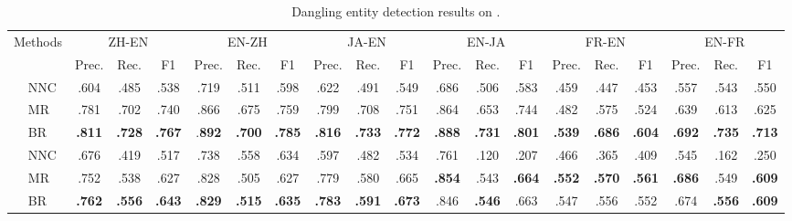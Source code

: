 \begin{table*}[!t]
	\centering
{
	\small
	\setlength{\tabcolsep}{3pt}
		\begin{tabular}{llcccccccccccccccccc}
			\toprule
\multicolumn{2}{c}{\multirow{2}{*}{Methods}} &
			\multicolumn{3}{c}{ZH-EN} & \multicolumn{3}{c}{EN-ZH} & \multicolumn{3}{c}{JA-EN} & \multicolumn{3}{c}{EN-JA} &  \multicolumn{3}{c}{FR-EN} & \multicolumn{3}{c}{EN-FR}\\
			\cmidrule(lr){3-5} \cmidrule(lr){6-8} \cmidrule(lr){9-11} \cmidrule(lr){12-14} \cmidrule(lr){15-17} \cmidrule(lr){18-20}
			&& Prec. & Rec. & F1 & Prec. & Rec. & F1 & Prec. & Rec. & F1 & Prec. & Rec. & F1 & Prec. & Rec. & F1 & Prec. & Rec. & F1 \\ 
			\midrule
			\parbox[t]{2mm}{} 
			& NNC & .604 & .485 & .538 & .719 & .511 & .598 & .622 & .491 & .549 & .686 & .506 & .583 & .459 & .447 & .453 & .557 & .543 & .550 \\
			& MR & .781 & .702 & .740 & .866 & .675 & .759 & .799 & .708 & .751 & .864 & .653 & .744 & .482 & .575 & .524 & .639 & .613 & .625 \\
			& BR & \textbf{.811} & \textbf{.728} & \textbf{.767} & .\textbf{892} & \textbf{.700} & \textbf{.785} & \textbf{.816} & \textbf{.733} & \textbf{.772} & \textbf{.888} & \textbf{.731} & \textbf{.801} & \textbf{.539} & \textbf{.686} & \textbf{.604} & \textbf{.692} & \textbf{.735} & \textbf{.713} \\
			\midrule
			\parbox[t]{2mm}{}
			& NNC & .676 & .419 & .517 & .738 & .558 & .634 & .597 & .482 & .534 & .761 & .120 & .207 & .466 & .365 & .409 & .545 & .162 & .250 \\
			& MR & .752 & .538 & .627 & .828 & .505 & .627 & .779 & .580 & .665 & \textbf{.854} & .543 & \textbf{.664} & \textbf{.552} & \textbf{.570} & \textbf{.561} & \textbf{.686} & .549 & \textbf{.609} \\
			& BR & \textbf{.762} & \textbf{.556} & \textbf{.643} & \textbf{.829} & \textbf{.515} & \textbf{.635} & \textbf{.783} & \textbf{.591} & \textbf{.673} & .846 & \textbf{.546} & .663 & .547 & .556 & .552 & .674 & \textbf{.556} & \textbf{.609} \\
			\bottomrule
	\end{tabular}}
	\caption{Dangling entity detection results on \dataset.}
	\label{tab:detection}
\end{table*}

